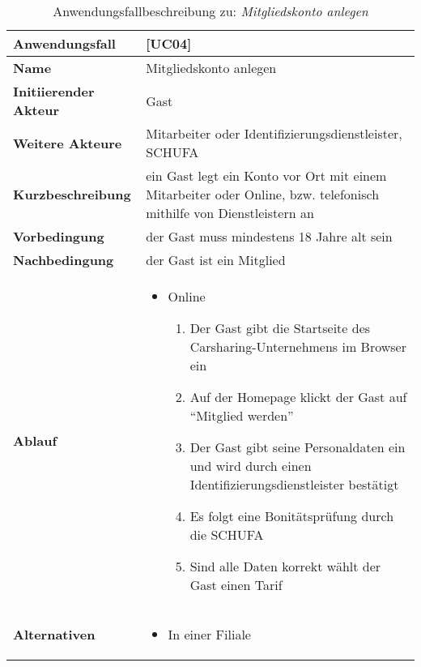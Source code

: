 \begin{table}[H]
    \centering
    \caption{Anwendungsfallbeschreibung zu: \emph{Mitgliedskonto anlegen}}
    \label{tab:anwendungsfallbeschreibung_mitgliedskonto_anlegen}
    \begin{tabularx}{\textwidth}{|l|X|}
        \toprule
        \textbf{Anwendungsfall}           &  [UC04]                            \\
        \hline
        \textbf{Name}                     & Mitgliedskonto anlegen                           \\
        \hline
        \textbf{Initiierender Akteur}     & Gast                           \\
        \hline
        \textbf{Weitere Akteure}          & Mitarbeiter oder Identifizierungsdienstleister, SCHUFA          \\
        \hline
        \textbf{Kurzbeschreibung} & ein Gast legt ein Konto vor Ort mit einem Mitarbeiter
        oder Online, bzw. telefonisch mithilfe von Dienstleistern an \\
        \hline
        \textbf{Vorbedingung}             & der Gast muss mindestens 18 Jahre alt sein \\
        \hline
        \textbf{Nachbedingung}            & der Gast ist ein Mitglied \\
        \hline
        \textbf{Ablauf} &
        \begin{itemize}
            \item Online
            \begin{enumerate}
                \item Der Gast gibt die Startseite des Carsharing-Unternehmens im Browser ein
                \item Auf der Homepage klickt der Gast auf ``Mitglied werden''
                \item Der Gast gibt seine Personaldaten ein und wird durch einen Identifizierungsdienstleister bestätigt
                \item Es folgt eine Bonitätsprüfung durch die SCHUFA
                \item Sind alle Daten korrekt wählt der Gast einen Tarif
            \end{enumerate}
        \end{itemize}\\
        \hline
        \textbf{Alternativen}             &
        \begin{itemize}
            \item In einer Filiale

\end{itemize}
\end{tabularx}
\end{table}
